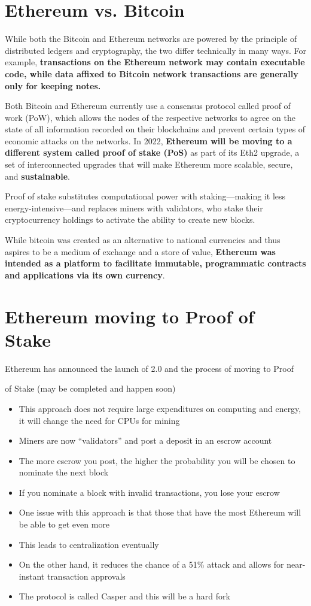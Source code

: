 \section{Ethereum vs. Bitcoin}

While both the Bitcoin and Ethereum networks are powered by the principle of distributed ledgers and cryptography, the two differ technically in many ways. For example, \textbf{transactions on the Ethereum network may contain executable code, while data affixed to Bitcoin network transactions are generally only for keeping notes.}

Both Bitcoin and Ethereum currently use a consensus protocol called proof of work (PoW), which allows the nodes of the respective networks to agree on the state of all information recorded on their blockchains and prevent certain types of economic attacks on the networks. In 2022, \textbf{Ethereum will be moving to a different system called proof of stake (PoS)} as part of its Eth2 upgrade, a set of interconnected upgrades that will make Ethereum more scalable, secure, and \textbf{sustainable}.

Proof of stake substitutes computational power with staking—making it less energy-intensive—and replaces miners with validators, who stake their cryptocurrency holdings to activate the ability to create new blocks.

While bitcoin was created as an alternative to national currencies and thus aspires to be a medium of exchange and a store of value, \textbf{Ethereum was intended as a platform to facilitate immutable, programmatic contracts and applications via its own currency}.
\section{Ethereum moving to Proof of Stake}

Ethereum has announced the launch of 2.0 and the process of moving to Proof

of Stake (may be completed and happen soon)
\begin{itemize}
	\item This approach does not require large expenditures on computing and energy, it will change the need for CPUs for mining
	\item Miners are now ``validators'' and post a deposit in an escrow account
	\item The more escrow you post, the higher the probability you will be chosen to nominate the next block
	\item If you nominate a block with invalid transactions, you lose your escrow
	\item One issue with this approach is that those that have the most Ethereum will be able to get even more
	\item This leads to centralization eventually
	\item On the other hand, it reduces the chance of a 51\% attack and allows for near-instant transaction approvals
	\item The protocol is called Casper and this will be a hard fork
\end{itemize}
